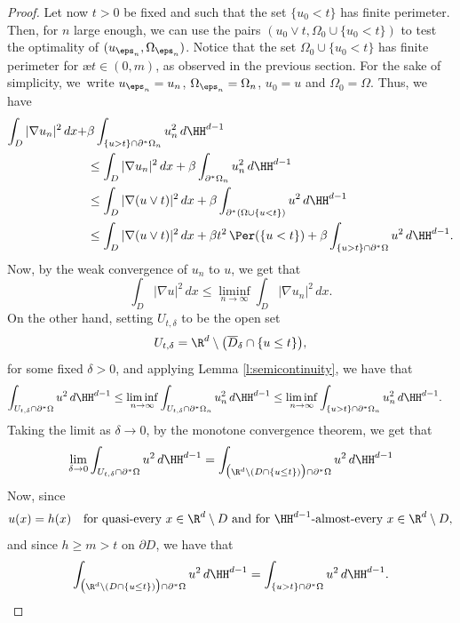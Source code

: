 \begin{proof}
Let now $t>0$ be fixed and such that the set $\{u_0<t\}$ has finite perimeter. Then, for $n$ large enough, we can use the pairs
$(u_0\vee t, \Omega_0\cup\{u_0< t\})$ to test the optimality of $(u_{\eps_n},\Omega_{\eps_n})$.
Notice that the set $\Omega_0\cup\{u_0< t\}$ has finite perimeter for \ae $t\in (0,m)$, as observed in the previous section.
For the sake of simplicity, we~write $u_{\eps_n}=u_n$, $\Omega_{\eps_n}=\Omega_n$, $u_0=u$ and $\Omega_0=\Omega$. Thus, we have
\begin{align}
\int_{D}|\nabla u_{n}|^2\,dx+&\beta\int_{\{u> t\}\cap \partial^\ast\Omega_{n}}u_{n}^2\,d\HH^{d-1}\notag\\
&\le \int_{D}|\nabla u_{n}|^2\,dx+\beta\int_{\partial^\ast\Omega_{n}}u_{n}^2\,d\HH^{d-1}\notag\\
&\le \int_{D}|\nabla (u\vee t)|^2\,dx+\beta\int_{\partial^\ast(\Omega\cup\{u<t\})}u^2\,d\HH^{d-1}\label{e:att}\\
&\le \int_{D}|\nabla (u\vee t)|^2\,dx+\beta t^2\, \Per(\{u<t\})+\beta\int_{\{u> t\}\cap \partial^\ast\Omega}u^2\,d\HH^{d-1}.\notag
\end{align}
Now, by the weak convergence of $u_n$ to $u$, we get that
\[\int_{D}|\nabla u|^2\,dx\le \liminf_{n\to\infty}\int_{D}|\nabla u_{n}|^2\,dx.\]
On the other hand, setting $U_{t,\delta}$ to be the open set
\[U_{t,\delta}=\R^d\setminus \big(\overline D_\delta\cap\{u\le t\}\big),\]
for some fixed $\delta>0$, and applying Lemma \ref{l:semicontinuity}, we have that
\begin{align*}
\int_{U_{t,\delta}\cap \partial^\ast\Omega}u^2\,d\HH^{d-1}&\le \liminf_{n\to\infty}\int_{U_{t,\delta}\cap \partial^\ast\Omega_{n}}u_{n}^2\,d\HH^{d-1}\le \liminf_{n\to\infty}\int_{\{u>t\}\cap \partial^\ast\Omega_{n}}u_{n}^2\,d\HH^{d-1}.
\end{align*}
Taking the limit as $\delta\to0$, by the monotone convergence theorem, we get that
\[\lim_{\delta\to0}\int_{U_{t,\delta}\cap \partial^\ast\Omega}u^2\,d\HH^{d-1}=\int_{\big(\R^d\setminus (D\cap\{u\le t\})\big)\cap \partial^\ast\Omega}u^2\,d\HH^{d-1}\]
Now, since
\[u(x)=h(x)\quad\text{for quasi-every } x\in \R^d\setminus D\text{ and for } \HH^{d-1}\text{-almost-every } x\in \R^d\setminus D,\]
and since $h\ge m>t$ on $\partial D$, we have that
\begin{equation}%
\int_{\big(\R^d\setminus (D\cap\{u\le t\})\big)\cap \partial^\ast\Omega}u^2\,d\HH^{d-1}=\int_{\{u>t\}\cap \partial^\ast\Omega}u^2\,d\HH^{d-1}.
\end{equation}

\end{proof}
